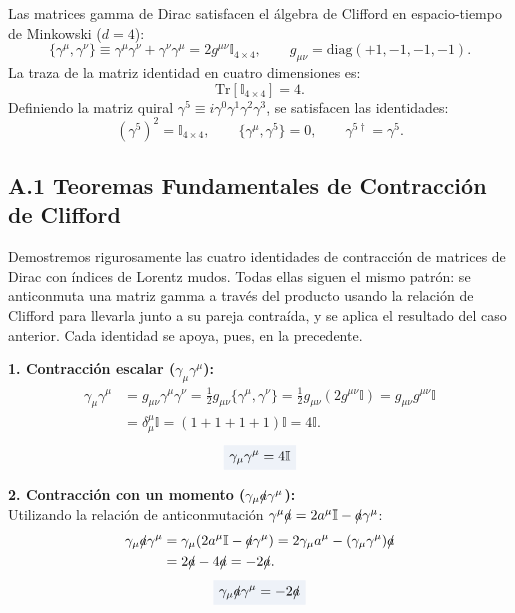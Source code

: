 \documentclass[10pt,a4paper]{article}
\newcommand{\dest}[1]{{\setlength{\fboxsep}{4pt}\colorbox{colordest}{$\displaystyle #1$}}}
\begin{document}
Las matrices gamma de Dirac satisfacen el álgebra de Clifford en espacio-tiempo de Minkowski ($d=4$):
\begin{equation}
\{\gamma^\mu, \gamma^\nu\} \equiv \gamma^\mu \gamma^\nu + \gamma^\nu \gamma^\mu = 2 g^{\mu\nu} \mathbb{I}_{4\times 4}, \qquad g_{\mu\nu} = \text{diag}(+1, -1, -1, -1).
\end{equation}
La traza de la matriz identidad en cuatro dimensiones es:
\begin{equation}
\text{Tr}[\mathbb{I}_{4\times 4}] = 4.
\end{equation}
Definiendo la matriz quiral $\gamma^5 \equiv i \gamma^0 \gamma^1 \gamma^2 \gamma^3$, se satisfacen las identidades:
\begin{equation}
(\gamma^5)^2 = \mathbb{I}_{4\times 4}, \qquad \{\gamma^\mu, \gamma^5\} = 0, \qquad \gamma^{5\dagger} = \gamma^5.
\end{equation}

\subsection*{A.1 Teoremas Fundamentales de Contracción de Clifford}
Demostremos rigurosamente las cuatro identidades de contracción de matrices de Dirac con índices de Lorentz mudos. Todas ellas siguen el mismo patrón: se anticonmuta una matriz gamma a través del producto usando la relación de Clifford para llevarla junto a su pareja contraída, y se aplica el resultado del caso anterior. Cada identidad se apoya, pues, en la precedente.

\textbf{1. Contracción escalar ($\gamma_\mu \gamma^\mu$):}
\begin{align}
\gamma_\mu \gamma^\mu &= g_{\mu\nu} \gamma^\mu \gamma^\nu = \frac{1}{2} g_{\mu\nu} \{\gamma^\mu, \gamma^\nu\} = \frac{1}{2} g_{\mu\nu} (2 g^{\mu\nu} \mathbb{I}) = g_{\mu\nu} g^{\mu\nu} \mathbb{I} \nonumber \\
&= \delta_\mu^\mu \mathbb{I} = (1 + 1 + 1 + 1)\mathbb{I} = 4 \mathbb{I}.
\end{align}
\begin{equation}
\dest{\gamma_\mu \gamma^\mu = 4 \mathbb{I}}
\label{eq:clifford_contract_0}
\end{equation}

\textbf{2. Contracción con un momento ($\gamma_\mu \slashed{a} \gamma^\mu$):}\\
Utilizando la relación de anticonmutación $\gamma^\mu \slashed{a} = 2 a^\mu \mathbb{I} - \slashed{a} \gamma^\mu$:
\begin{align}
\gamma_\mu \slashed{a} \gamma^\mu &= \gamma_\mu (2 a^\mu \mathbb{I} - \slashed{a} \gamma^\mu) = 2 \gamma_\mu a^\mu - (\gamma_\mu \gamma^\mu) \slashed{a} \nonumber \\
&= 2 \slashed{a} - 4 \slashed{a} = -2 \slashed{a}.
\end{align}
\begin{equation}
\dest{\gamma_\mu \slashed{a} \gamma^\mu = -2 \slashed{a}}
\label{eq:clifford_contract_1}
\end{equation}
\end{document}
